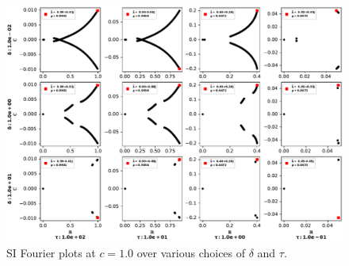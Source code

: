 \begin{figure}
\begin{center}
	\includegraphics[width=\textwidth]{appendix/eig_plots/si1.0.pdf}
	\caption{SI Fourier plots at $c=1.0$ over various choices of $\delta$ and $\tau$.}
\end{center}
\end{figure}

